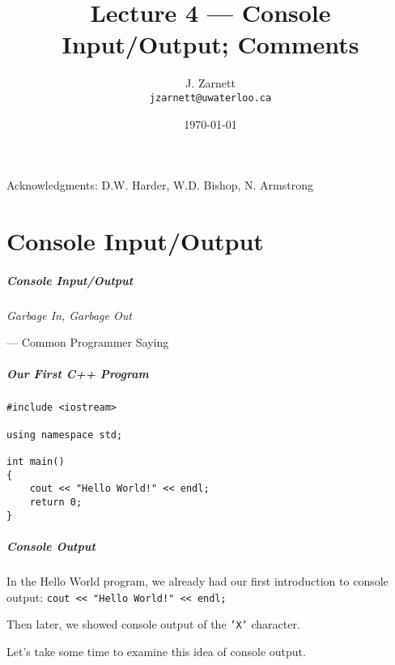 

\title{Lecture 4 --- Console Input/Output; Comments}

\author{J. Zarnett\\
\texttt{jzarnett@uwaterloo.ca}}
\date{\today}



\begin{frame}
  \titlepage
  
  \begin{center}
  \small{Acknowledgments: D.W. Harder, W.D. Bishop, N. Armstrong}
  \end{center}
 \end{frame}
 

\part{Console Input/Output}
\begin{frame}\partpage\end{frame}

\begin{frame}
\frametitle{Console Input/Output}

\vspace{-5em}
\begin{center}
	\textit{Garbage In, Garbage Out}
\end{center}
\vspace{-5em}
\hfill --- Common Programmer Saying

\end{frame}

\begin{frame}[fragile]
\frametitle{Our First C++ Program}

\begin{verbatim}
#include <iostream>

using namespace std;

int main()
{
    cout << "Hello World!" << endl;
    return 0;
}
\end{verbatim}

\end{frame}

\begin{frame}
\frametitle{Console Output}
In the Hello World program, we already had our first introduction to console output: \texttt{cout << "Hello World!" << endl;}

Then later, we showed console output of the \texttt{'X'} character.

Let's take some time to examine this idea of console output.

\end{frame}

